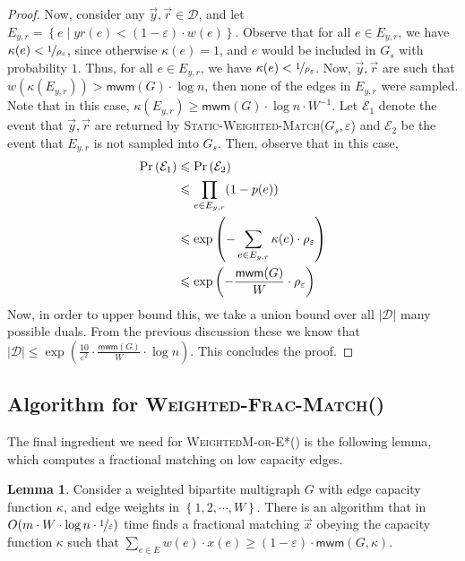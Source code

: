 \documentclass[a4paper,11pt]{article}
\DeclareMathOperator*{\Prob}{\ensuremath{\textnormal{Pr}}}
\renewcommand{\Pr}{\Prob}
\newcommand{\prob}[1]{\Pr\paren{#1}}
\newcommand{\card}[1]{|#1|}
\newcommand{\paren}[1]{\left ( #1 \right )}
\newcommand{\set}[1]{\ensuremath{\left\{ #1 \right\}}}
\newcommand{\eps}{\varepsilon}
\theoremstyle{definition}
\theoremstyle{definition}
\theoremstyle{definition}
\theoremstyle{definition}
\theoremstyle{definition}
\newtheorem{lemma2}[definition2]{Lemma}
\theoremstyle{definition}
\theoremstyle{definition}
\theoremstyle{definition}
\theoremstyle{definition}
\theoremstyle{definition}
\theoremstyle{definition}
\theoremstyle{definition}
\theoremstyle{definition}
\theoremstyle{definition}
\theoremstyle{definition}
\begin{document}
\begin{proof}
Now, consider any $\vec{y}, \vec{r}\in \mathcal{D}$, and let $E_{y,r}=\set{e\mid yr(e)<(1-\eps)\cdot w(e)}$. Observe that for all $e\in E_{y,r}$, we have $\kappa(e)<\nicefrac{1}{\rho_{\eps}}$, since otherwise $\kappa(e)=1$, and $e$ would be included in $G_s$ with probability $1$. Thus, for all $e\in E_{y,r}$, we have $\kappa(e)<\nicefrac{1}{\rho_{\eps}}$. Now, $\vec{y},\vec{r}$ are such that $w(\kappa(E_{y,r}))>\textsf{mwm}(G)\cdot \log n$, then none of the edges in $E_{y,r}$ were sampled. Note that in this case, $\kappa(E_{y,r})\geqslant \textsf{mwm}(G)\cdot \log n\cdot W^{-1}$. Let $\mathcal{E}_1$ denote the event that $\vec{y},\vec{r}$ are returned by \textsc{Static-Weighted-Match}($G_s,\eps$) and $\mathcal{E}_2$ be the event that $E_{y,r}$ is not sampled into $G_s$. Then, observe that in this case, 
\begin{align*}
\prob{\mathcal{E}_1}&\leqslant \prob{\mathcal{E}_2}\\
                                 &\leqslant \prod_{e\in E_{y,r}}(1-p(e))\\
                                 &\leqslant \exp\paren{-\sum_{e\in E_{y,r}}\kappa(e)\cdot \rho_{\eps}}\\
                                 &\leqslant \exp\paren{-\frac{ \textsf{mwm}(G)}{W}\cdot \rho_{\eps}}
\end{align*}
Now, in order to upper bound this, we take a union bound over all $\card{\mathcal{D}}$ many possible duals. From the previous discussion these we know that $\card{\mathcal{D}}\leqslant \exp\paren{\frac{10}{\eps^2}\cdot \frac{\textsf{mwm}(G)}{W}\cdot \log n}$. This concludes the proof.
 \end{proof}

\subsection{Algorithm for \textsc{Weighted-Frac-Match}()}

The final ingredient we need for \textsc{WeightedM-or-E*}() is the following lemma, which computes a fractional matching on low capacity edges.

\begin{lemma2}\label{lem:Hungarian2}
Consider a weighted bipartite multigraph $G$ with edge capacity function $\kappa$, and edge weights in $\set{1,2,\cdots, W}$. There is an algorithm that in $O(m\cdot W\cdot \log n\cdot \nicefrac{1}{\eps})$ time finds a fractional matching $\vec{x}$ obeying the capacity function $\kappa$ such that $\sum_{e\in E}w(e)\cdot x(e)\geqslant (1-\eps)\cdot \textsf{mwm}(G,\kappa)$.
\end{lemma2}
\end{document}
